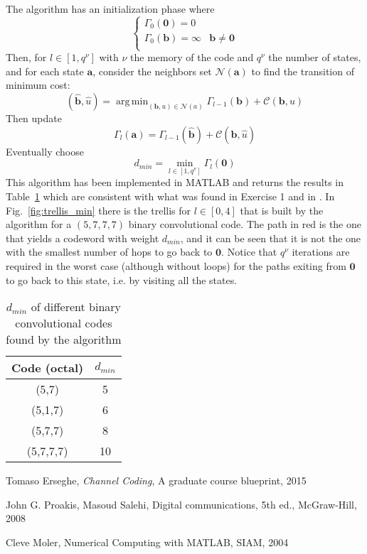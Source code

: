 \documentclass[10pt]{article}
\DeclareMathOperator*{\argmin}{arg\,min}
\begin{document}
The algorithm has an initialization phase where 
\begin{equation}
\begin{cases}
	\Gamma_0(\mathbf{0}) = 0 \\
	\Gamma_0(\mathbf{b}) = \infty & \mathbf{b} \ne \mathbf{0} \\

\end{cases}
\end{equation}	
Then, for $l \in [1, q^{\nu}]$ with $\nu$ the memory of the code and $q^{\nu}$ the number of states, and for each state $\mathbf{a}$, consider the neighbors set $\mathcal{N}(\mathbf{a})$ to find the transition of minimum cost:
\begin{equation}
	(\mathbf{\hat{b}}, \hat{u}) = \argmin_{(\mathbf{b}, u) \in \mathcal{N}(a)} \Gamma_{l-1}(\mathbf{b}) + \mathcal{C}(\mathbf{b}, u)
\end{equation}
Then update 
\begin{equation}
	\Gamma_{l}(\mathbf{a}) = \Gamma_{l-1}(\mathbf{\hat{b}}) + \mathcal{C}(\mathbf{\hat{b}}, \hat{u})
\end{equation}
Eventually choose 
\begin{equation}
	d_{min} = \min_{l \in [1, q^{\nu}]} \Gamma_l(\mathbf{0})
\end{equation}
This algorithm has been implemented in MATLAB and returns the results in Table~\ref{table:dmin} which are consistent with what was found in Exercise 1 and in \cite{proakis}. In Fig.~\ref{fig:trellis_min} there is the trellis for $l\in[0,4]$ that is built by the algorithm for a $(5,7,7,7)$ binary convolutional code. The path in red is the one that yields a codeword with weight $d_{min}$, and it can be seen that it is not the one with the smallest number of hops to go back to $\mathbf{0}$. Notice that $q^{\nu}$ iterations are required in the worst case (although without loops) for the paths exiting from $\mathbf{0}$ to go back to this state, i.e. by visiting all the states.

\begin{table}[h]
	\centering
	\begin{tabular}{c|c}
		\toprule
		Code (octal) & $d_{min}$ \\
		\midrule
		(5,7) & 5 \\
		(5,1,7) & 6 \\
		(5,7,7) & 8 \\
		(5,7,7,7) & 10 \\
	\end{tabular}
	\caption{$d_{min}$ of different binary convolutional codes found by the algorithm}
	\label{table:dmin}
\end{table}

\begin{thebibliography}{10}

 Tomaso Erseghe, \emph{Channel Coding}, A graduate course blueprint, 2015

 John G. Proakis, Masoud Salehi, Digital communications, 5th ed., McGraw-Hill, 2008

 Cleve Moler, Numerical Computing with MATLAB, SIAM, 2004

\end{thebibliography}
\end{document}
